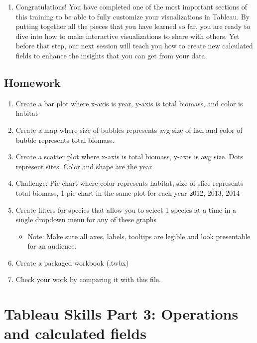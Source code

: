 \documentclass[
]{book}
\providecommand{\tightlist}{%
  \setlength{\itemsep}{0pt}\setlength{\parskip}{0pt}}
\begin{document}
\begin{enumerate}
\def\labelenumi{\arabic{enumi}.}
\tightlist
\item
  Congratulations! You have completed one of the most important sections of this training to be able to fully customize your visualizations in Tableau. By putting together all the pieces that you have learned so far, you are ready to dive into how to make interactive visualizations to share with others. Yet before that step, our next session will teach you how to create new calculated fields to enhance the insights that you can get from your data.
\end{enumerate}

\hypertarget{homework}{%
\subsection{Homework}\label{homework}}

\begin{enumerate}
\def\labelenumi{\arabic{enumi}.}
\tightlist
\item
  Create a bar plot where x-axis is year, y-axis is total biomass, and color is habitat
\item
  Create a map where size of bubbles represents avg size of fish and color of bubble represents total biomass.
\item
  Create a scatter plot where x-axis is total biomass, y-axis is avg size. Dots represent sites. Color and shape are the year.
\item
  Challenge: Pie chart where color represents habitat, size of slice represents total biomass, 1 pie chart in the same plot for each year 2012, 2013, 2014
\item
  Create filters for species that allow you to select 1 species at a time in a single dropdown menu for any of these graphs

  \begin{itemize}
  \tightlist
  \item
    Note: Make sure all axes, labels, tooltips are legible and look presentable for an audience.
  \end{itemize}
\item
  Create a packaged workbook (.twbx)
\item
  Check your work by comparing it with this file.
\end{enumerate}

\hypertarget{tableau-skills-part-3-operations-and-calculated-fields}{%
\section{Tableau Skills Part 3: Operations and calculated fields}\label{tableau-skills-part-3-operations-and-calculated-fields}}
\end{document}
